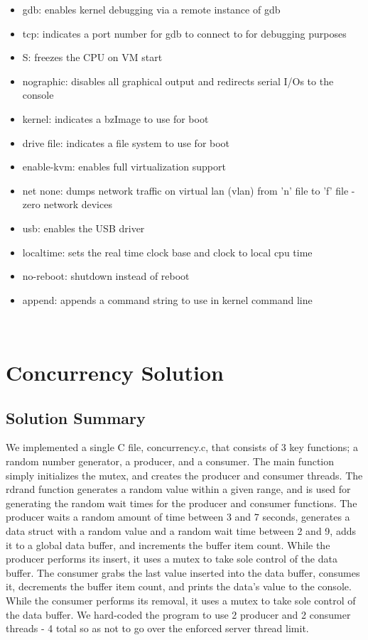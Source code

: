 \documentclass[onecolumn, draftclsnofoot,10pt, compsoc]{IEEEtran}
\begin{document}
\begin{itemize}

\item gdb:  enables kernel debugging via a remote instance of gdb
\item tcp:  indicates a port number for gdb to connect to for debugging purposes
\item S:  freezes the CPU on VM start
\item nographic:  disables all graphical output and redirects serial I/Os to the console
\item kernel:  indicates a bzImage to use for boot
\item drive file:  indicates a file system to use for boot
\item enable-kvm: enables full virtualization support
\item net none:  dumps network traffic on virtual lan (vlan) from 'n' file to 'f' file - zero network devices
\item usb:  enables the USB driver
\item localtime:  sets the real time clock base and clock to local cpu time
\item no-reboot:  shutdown instead of reboot
\item append:  appends a command string to use in kernel command line 

\end{itemize}

\noindent 
\\

\section{Concurrency Solution}

\subsection{Solution Summary}

\noindent
We implemented a single C file, concurrency.c, that consists of 3 key functions; a random number generator, a producer, and a consumer. The main function simply initializes the mutex, and creates the producer and consumer threads. The rdrand function generates a random value within a given range, and is used for generating the random wait times for the producer and consumer functions. The producer waits a random amount of time between 3 and 7 seconds, generates a data struct with a random value and a random wait time between 2 and 9, adds it to a global data buffer, and increments the buffer item count. While the producer performs its insert, it uses a mutex to take sole control of the data buffer. The consumer grabs the last value inserted into the data buffer, consumes it, decrements the buffer item count, and prints the data's value to the console. While the consumer performs its removal, it uses a mutex to take sole control of the data buffer. We hard-coded the program to use 2 producer and 2 consumer threads - 4 total so as not to go over the enforced server thread limit. 
\\
\end{document}
